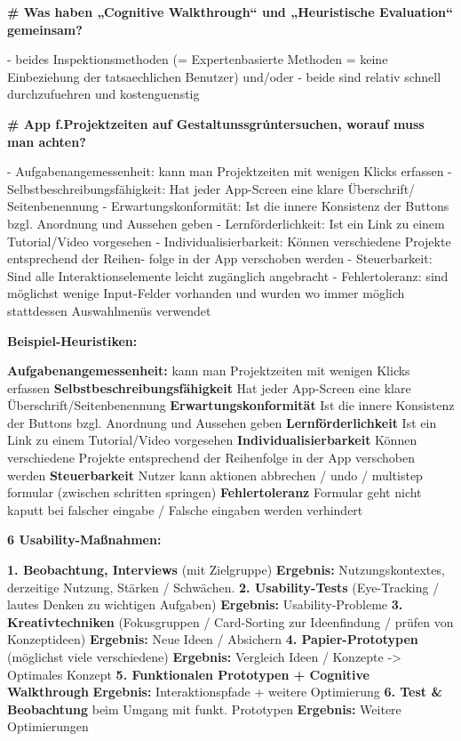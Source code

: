 \documentclass{article}
\begin{document}
\begin{multicols}{3}
\begin{flushleft}
\begin{tiny}
			\textbf{\# Was haben „Cognitive Walkthrough“ und „Heuristische
				Evaluation“ gemeinsam?}

			- beides Inspektionsmethoden (= Expertenbasierte Methoden = keine
			  Einbeziehung der tatsaechlichen Benutzer) und/oder
			- beide sind relativ schnell durchzufuehren und kostenguenstig

			\textbf{\# App f.Projektzeiten auf Gestaltunssgr\. untersuchen,
				worauf muss man achten?}

			- Aufgabenangemessenheit: kann man Projektzeiten mit wenigen Klicks
			  erfassen
			- Selbstbeschreibungsfähigkeit: Hat jeder App-Screen eine
			  klare Überschrift/ Seitenbenennung
			- Erwartungskonformität: Ist die
			  innere Konsistenz der Buttons bzgl. Anordnung und Aussehen geben
			- Lernförderlichkeit: Ist ein Link zu einem Tutorial/Video
			  vorgesehen
			- Individualisierbarkeit: Können verschiedene Projekte entsprechend
			  der Reihen- folge in der App verschoben werden
			- Steuerbarkeit: Sind alle Interaktionselemente leicht zugänglich
			  angebracht
			- Fehlertoleranz: sind möglichst wenige Input-Felder vorhanden und
			  wurden wo immer möglich stattdessen Auswahlmenüs verwendet

			\textbf{Beispiel-Heuristiken:}

			\textbf{Aufgabenangemessenheit:} kann man Projektzeiten mit
				wenigen Klicks erfassen
			\textbf{Selbstbeschreibungsfähigkeit} Hat jeder App-Screen eine
				klare Überschrift/Seitenbenennung
			\textbf{Erwartungskonformität} Ist die innere Konsistenz der
				Buttons bzgl. Anordnung und Aussehen geben
			\textbf{Lernförderlichkeit} Ist ein Link zu einem Tutorial/Video
				vorgesehen
			\textbf{Individualisierbarkeit} Können verschiedene Projekte
				entsprechend der Reihenfolge in der App verschoben werden
			\textbf{Steuerbarkeit} Nutzer kann aktionen abbrechen / undo /
				multistep formular (zwischen schritten springen)
			\textbf{Fehlertoleranz} Formular geht nicht kaputt bei falscher
				eingabe / Falsche eingaben werden verhindert

			\textbf{6 Usability-Maßnahmen:}

			\textbf{1. Beobachtung, Interviews} (mit Zielgruppe)
			\textbf{Ergebnis:} Nutzungskontextes, derzeitige Nutzung,
				Stärken / Schwächen.
			\textbf{2. Usability-Tests} (Eye-Tracking / lautes Denken zu
				wichtigen Aufgaben)
			\textbf{Ergebnis:} Usability-Probleme
			\textbf{3. Kreativtechniken} (Fokusgruppen / Card-Sorting zur
				Ideenfindung / prüfen von Konzeptideen)
			\textbf{Ergebnis:} Neue Ideen / Absichern
			\textbf{4. Papier-Prototypen} (möglichst viele verschiedene)
			\textbf{Ergebnis:} Vergleich Ideen / Konzepte -> Optimales
				Konzept
			\textbf{5. Funktionalen Prototypen + Cognitive Walkthrough}
			\textbf{Ergebnis:} Interaktionspfade + weitere Optimierung
			\textbf{6. Test \& Beobachtung} beim Umgang mit funkt.
				Prototypen
			\textbf{Ergebnis:} Weitere Optimierungen


\end{tiny}
\end{flushleft}
\end{multicols}
\end{document}

